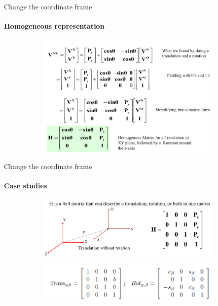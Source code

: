 \documentclass[aspectratio=169,xcolor=table,10pt, notes=hide]{beamer}
\begin{document}
    \begin{frame}[t]{Change the coordinate frame}
    \framesubtitle{Homogeneous representation}
        \begin{figure}[H]
            \centering\includegraphics[height=6cm,width=1\textwidth,keepaspectratio]{image34.png}
            \label{fig:image34}
        \end{figure}
    \end{frame}
    
    \begin{frame}[t]{Change the coordinate frame}
    \framesubtitle{Case studies}
        \begin{figure}[H]
            \begin{subfigure}{1\textwidth}
                \centering\includegraphics[height=0.35\textheight,keepaspectratio]{image33.png}
                \label{fig:image33}
            \end{subfigure}
            \begin{subfigure}{1\textwidth}
                \centering\includegraphics[height=0.34\textheight,keepaspectratio]{image29.png}
                \label{fig:image29}
            \end{subfigure}
        \end{figure}
    \end{frame}
\end{document}
